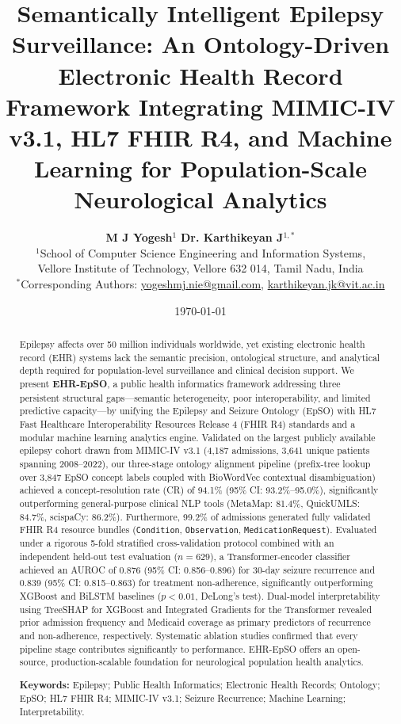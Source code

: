 \documentclass[11pt,a4paper]{article}
\title{\textbf{Semantically Intelligent Epilepsy Surveillance: An Ontology-Driven Electronic Health Record Framework Integrating MIMIC-IV v3.1, HL7 FHIR R4, and Machine Learning for Population-Scale Neurological Analytics}}
\author{
  \textbf{M J Yogesh}$^1$ \quad \textbf{Dr. Karthikeyan J}$^{1,*}$ \\[0.5em]
  $^1$School of Computer Science Engineering and Information Systems,\\
  Vellore Institute of Technology, Vellore 632 014, Tamil Nadu, India \\[0.3em]
  \small{$^*$Corresponding Authors: \href{mailto:yogeshmj.nie@gmail.com}{yogeshmj.nie@gmail.com}, \href{mailto:karthikeyan.jk@vit.ac.in}{karthikeyan.jk@vit.ac.in}}
}
\date{\today}
\begin{document}
\maketitle

\begin{abstract}
Epilepsy affects over 50 million individuals worldwide, yet existing electronic health record (EHR) systems lack the semantic precision, ontological structure, and analytical depth required for population-level surveillance and clinical decision support. We present \textbf{EHR-EpSO}, a public health informatics framework addressing three persistent structural gaps---semantic heterogeneity, poor interoperability, and limited predictive capacity---by unifying the Epilepsy and Seizure Ontology (EpSO) with HL7 Fast Healthcare Interoperability Resources Release 4 (FHIR R4) standards and a modular machine learning analytics engine. Validated on the largest publicly available epilepsy cohort drawn from MIMIC-IV v3.1 (4,187 admissions, 3,641 unique patients spanning 2008--2022), our three-stage ontology alignment pipeline (prefix-tree lookup over 3,847 EpSO concept labels coupled with BioWordVec contextual disambiguation) achieved a concept-resolution rate (CR) of 94.1\% (95\% CI: 93.2\%--95.0\%), significantly outperforming general-purpose clinical NLP tools (MetaMap: 81.4\%, QuickUMLS: 84.7\%, scispaCy: 86.2\%). Furthermore, 99.2\% of admissions generated fully validated FHIR R4 resource bundles (\texttt{Condition}, \texttt{Observation}, \texttt{MedicationRequest}). Evaluated under a rigorous 5-fold stratified cross-validation protocol combined with an independent held-out test evaluation ($n=629$), a Transformer-encoder classifier achieved an AUROC of 0.876 (95\% CI: 0.856--0.896) for 30-day seizure recurrence and 0.839 (95\% CI: 0.815--0.863) for treatment non-adherence, significantly outperforming XGBoost and BiLSTM baselines ($p < 0.01$, DeLong's test). Dual-model interpretability using TreeSHAP for XGBoost and Integrated Gradients for the Transformer revealed prior admission frequency and Medicaid coverage as primary predictors of recurrence and non-adherence, respectively. Systematic ablation studies confirmed that every pipeline stage contributes significantly to performance. EHR-EpSO offers an open-source, production-scalable foundation for neurological population health analytics.

\vspace{0.5em}
\noindent \textbf{Keywords:} Epilepsy; Public Health Informatics; Electronic Health Records; Ontology; EpSO; HL7 FHIR R4; MIMIC-IV v3.1; Seizure Recurrence; Machine Learning; Interpretability.
\end{abstract}
\end{document}
